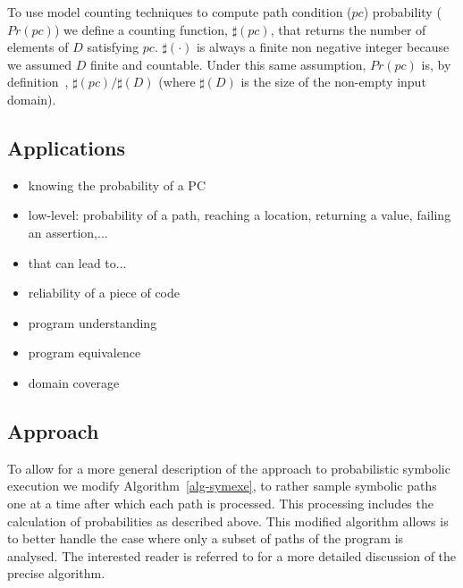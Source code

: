 To use model counting techniques to compute path condition ($pc$) probability ($Pr(pc)$) we define a counting function,  $\sharp(pc)$, that returns the number of elements of $D$ satisfying $pc$. $\sharp(\cdot)$ is always a finite non negative
integer because we assumed $D$ finite and countable. Under this same
assumption, $\textit{Pr}(pc)$ is, by definition~\cite{pestman2009},
$\sharp(pc) / \sharp(D)$ (where $\sharp(D)$ is the size of the non-empty
input domain). 

\subsection{Applications}

\begin{itemize}
\item knowing the probability of a PC
\item low-level: probability of a path, reaching a location, returning a value, failing an assertion,... 
\item that can lead to...
\item reliability of a piece of code
\item program understanding
\item program equivalence
\item domain coverage
\end{itemize}

\subsection{Approach}

To allow for a more general description of the approach to probabilistic symbolic execution we modify Algorithm~\ref{alg-symexe}, to rather sample symbolic paths one at a time after which each path is processed. This processing includes the calculation of probabilities as described above. This modified algorithm allows is to better handle the case where only a subset of paths of the program is analysed. The interested reader is referred to \cite{FSE014} for a more detailed discussion of the precise algorithm.

